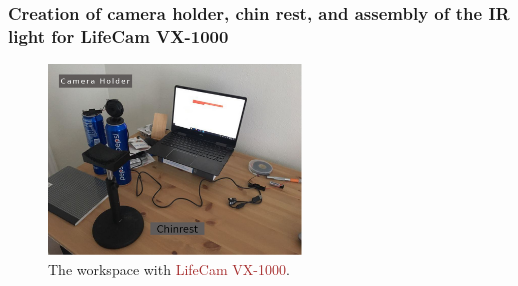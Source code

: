 \documentclass{beamer}
\begin{document}
    \begin{frame}
        \frametitle{Creation of camera holder, chin rest, and assembly of the
        IR light for LifeCam VX-1000}

        \begin{figure}
            \begin{center}
                \includegraphics[width=0.6\textwidth]{Work_space_VX_1000.jpg}
            \end{center}
            \caption{The workspace with \textcolor{brown}{LifeCam VX-1000}.}
            \label{fig:Workspace_VX}
        \end{figure}

    \end{frame}
\end{document}
